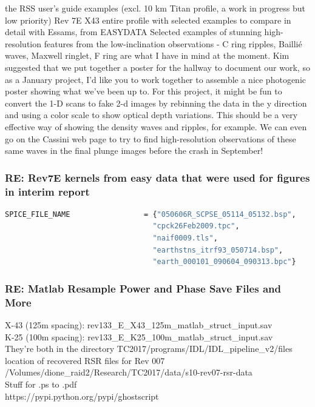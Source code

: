\documentclass[crop=false,class=article,oneside]{standalone}
\begin{document}
the RSS user's guide examples (excl. 10 km Titan profile, a work in progress but low priority)
Rev 7E X43 entire profile with selected examples to compare in detail with Essams, from EASYDATA
Selected examples of stunning high-resolution features from the low-inclination observations - C ring ripples, Baillié waves, Maxwell ringlet, F ring are what I have in mind at the moment.
Kim suggested that we put together a poster for the hallway to document our work, so as a January project, I'd like you to work together to assemble a nice photogenic poster showing what we've been up to. For this project, it might be fun to convert the 1-D scans to fake 2-d images by rebinning the data in the y direction and using a color scale to show optical depth variations. This should be a very effective way of showing the density waves and ripples, for example. We can even go on the Cassini web page to try to find high-resolution observations of these same waves in the final plunge images before the crash in September!
\subsubsection{\footnotesize RE: Rev7E kernels from easy data that were used for figures in interim report}
\begin{lstlisting}[language=bash,basicstyle=\footnotesize]
SPICE_FILE_NAME                 = {"050606R_SCPSE_05114_05132.bsp",
                                  "cpck26Feb2009.tpc",
                                  "naif0009.tls",
                                  "earthstns_itrf93_050714.bsp",
                                  "earth_000101_090604_090313.bpc"}
\end{lstlisting}
\subsubsection{\footnotesize RE: Matlab Resample Power and Phase Save Files and More}
X-43 (125m spacing): rev133\_E\_X43\_125m\_matlab\_struct\_input.sav\\
K-25 (100m spacing): rev133\_E\_K25\_100m\_matlab\_struct\_input.sav\\
They’re both in the directory TC2017/programs/IDL/IDL\_pipeline\_v2/files\\
location of recovered RSR files for Rev 007\\
/Volumes/dione\_raid2/Research/TC2017/data/s10-rev07-rsr-data\\
Stuff for .ps to .pdf\\
https://pypi.python.org/pypi/ghostscript
\end{document}
